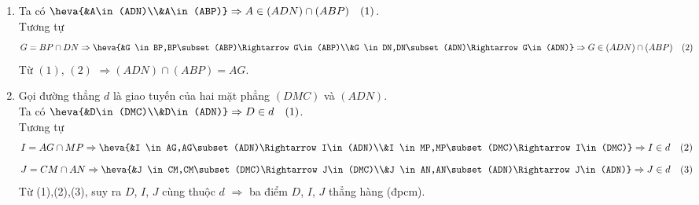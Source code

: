 \begin{bt}
\begin{vd}
{\begin{enumerate}
			\item Ta có 
			$\heva{&A\in(ADN)\\&A\in(ABP)}\Rightarrow A\in (ADN)\cap (ABP) \quad (1)$.\\
			Tương tự
			$$G=BP\cap DN \Rightarrow \heva{&G \in BP,BP\subset (ABP)\Rightarrow G\in(ABP)\\&G \in DN,DN\subset (ADN)\Rightarrow G\in(ADN)}\Rightarrow G\in(ADN)\cap (ABP) \quad (2)$$
			Từ $(1)$, $(2)$ $\Rightarrow (ADN)\cap (ABP)=AG$.
			\item Gọi đường thẳng $d$ là giao tuyến của hai mặt phẳng $(DMC)$ và $(ADN)$.\\
			Ta có 
			$\heva{&D\in(DMC)\\&D\in(ADN)}\Rightarrow D\in d\quad (1)$.\\
			Tương tự
			$$I=AG\cap MP \Rightarrow \heva{&I \in AG,AG\subset (ADN)\Rightarrow I\in(ADN)\\&I \in MP,MP\subset (DMC)\Rightarrow I\in(DMC)}\Rightarrow I\in d\quad (2)$$
			$$J=CM\cap AN \Rightarrow \heva{&J \in CM,CM\subset (DMC)\Rightarrow J\in(DMC)\\&J \in AN,AN\subset (ADN)\Rightarrow J\in(ADN)}\Rightarrow J\in d\quad (3)$$
			Từ (1),(2),(3), suy ra $D$, $I$, $J$ cùng thuộc $d$ $\Rightarrow$ ba điểm $D$, $I$, $J$ thẳng hàng (đpcm).
		\end{enumerate}	
	}
\end{vd}

\end{bt}
